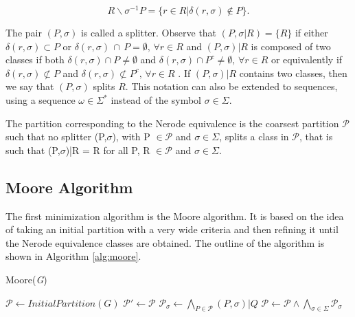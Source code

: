 {\[
R\backslash\sigma^{-1}P = \{r \in R | \delta(r,\sigma) \notin P\}.
\]

The pair $(P, \sigma)$ is called a splitter. Observe that $(P, \sigma|R) = \{R\}$ if either $\delta(r,\sigma) \subset P$
or $\delta(r,\sigma)\,\cap\,P = \emptyset,\,\forall r \in R$ and $(P,\sigma)|R$ is composed of two classes if both $\delta(r,\sigma)\cap P  \neq \emptyset$ and
$\delta(r,\sigma)\cap P^c  \neq \emptyset, \,\forall r \in R$  or equivalently if $\delta(r,\sigma) \not\subset P $   and  $\delta(r,\sigma)\not\subset P^c, \, \forall r \in R $ . If $(P, \sigma)|R$ contains two classes, then we say that $(P, \sigma)$ splits $R$. This notation can also be extended to sequences, using a sequence $\omega \in \Sigma^*$ instead of the symbol $\sigma \in \Sigma$.

\begin{proposition}\label{prop:nerequiv}
The partition corresponding to the Nerode equivalence is the coarsest partition $\mathcal{P}$ such that no splitter (P,$\sigma$), with P $\in \mathcal{P}$ and $\sigma \in \Sigma$, splits a class in $\mathcal{P}$, that is such that (P,$\sigma$)|R = {R} for all P, R $\in \mathcal{P}$ and $\sigma \in \Sigma$.
\end{proposition}

 
%
%
%
\subsection{Moore Algorithm}

The first minimization algorithm is the Moore algorithm. It is based on the idea of taking an initial partition with a very wide criteria and then refining it until the Nerode equivalence classes are obtained. The outline of the algorithm is shown in Algorithm \ref{alg:moore}.

\begin{algorithm} [b]
  \caption{Moore(\textit{G})\label{alg:moore}}
    \begin{algorithmic}[1]
      \State $\mathcal{P} \leftarrow InitialPartition(G)$
      \Repeat
      	\State $\mathcal{P}' \leftarrow \mathcal{P}$
      	\ForAll{$\sigma \in \Sigma$}
      		\State $\mathcal{P}_{\sigma} \leftarrow \bigwedge_{P\in \mathcal{P}}(P,\sigma)|Q$
      	\EndFor
      	\State $\mathcal{P} \leftarrow \mathcal{P}\wedge\bigwedge_{\sigma\in\Sigma}\mathcal{P}_{\sigma}$
    \end{algorithmic}
  \end{algorithm}
 
}
